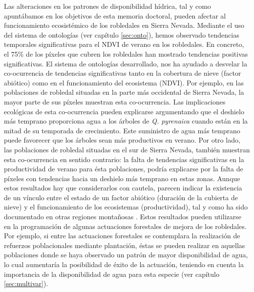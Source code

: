 Las alteraciones en los patrones de disponibilidad hídrica, tal y como apuntábamos en los objetivos de esta memoria doctoral, pueden afectar al funcionamiento ecosistémico de los robledales en Sierra Nevada. Mediante el uso del sistema de ontologías (ver capítulo \ref{sec:onto}), hemos observado tendencias temporales significativas para el NDVI de verano en los robledales. En concreto, el 75\% de los píxeles que cubren los robledales han mostrado tendencias positivas significativas. El sistema de ontologías desarrollado, nos ha ayudado a desvelar la co-ocurrencia de tendencias significativas tanto en la cobertura de nieve (factor abiótico) como en el funcionamiento del ecosistema (NDVI). Por ejemplo, en las poblaciones de robledal situadas en la parte más occidental de Sierra Nevada, la mayor parte de sus píxeles muestran esta co-ocurrencia. Las implicaciones ecológicas de esta co-ocurrencia pueden explicarse argumentando que el deshielo más temprano proporciona agua a los árboles de \emph{Q. pyrenaica} cuando están en la mitad de su temporada de crecimiento. Este suministro de agua más temprano puede favorecer que los árboles sean más productivos en verano. Por otro lado, las poblaciones de robledal situadas en el sur de Sierra Nevada, también muestran esta co-ocurrencia en sentido contrario: la falta de tendencias significativas en la productividad de verano para ésta poblaciones, podría explicarse por la falta de píxeles con tendencias hacia un deshielo más temprano en estas zonas. Aunque estos resultados hay que considerarlos con cautela, parecen indicar la existencia de un vínculo entre el estado de un factor abiótico (duración de la cubierta de nieve) y el funcionamiento de los ecosistemas (productividad), tal y como ha sido documentado en otras regiones montañosas \autocite{Wanetal2014ChangeSnow,DyeTucker2003SeasonalityTrends}. Estos resultados pueden utilizarse en la programación de algunas actuaciones forestales de mejora de los robledales. Por ejemplo, si entre las actuaciones forestales se contemplara la realización de refuerzos poblacionales mediante plantación, éstas se pueden realizar en aquellas poblaciones donde se haya observado un patrón de mayor disponibilidad de agua, lo cual aumentaría la posibilidad de éxito de la actuación, teniendo en cuenta la importancia de la disponibilidad de agua para esta especie (ver capítulo \ref{sec:multivar}). 

